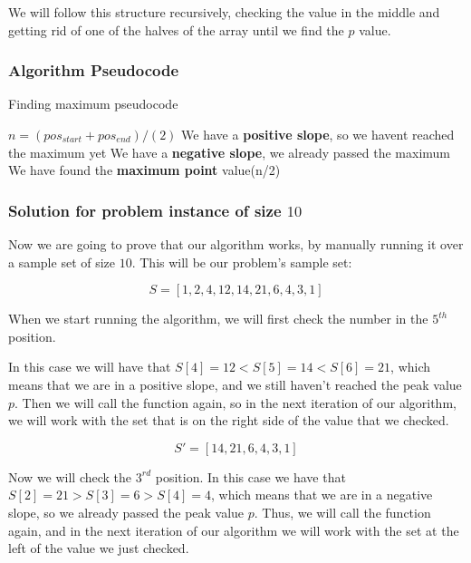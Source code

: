 \documentclass{article}
\begin{document}
We will follow this structure recursively, checking the value in the middle and getting rid of one of the halves of the array until we find the $p$ value.

\subsubsection*{Algorithm Pseudocode}

\begin{algorithm}[H]
\caption{Finding maximum pseudocode}
\begin{algorithmic}[1]
 \State $n = (pos_{start}+pos_{end})/(2)$
  \State We have a \textbf{positive slope}, so we havent reached the maximum yet
  \State {}
  \State We have a \textbf{negative slope}, we already passed the maximum
  \State {}
  \State We have found the \textbf{maximum point}
  \State \Return value(n/2)
 \EndIf
\EndFunction
\end{algorithmic}
\end{algorithm}

\subsubsection*{Solution for problem instance of size $10$}

Now we are going to prove that our algorithm works, by manually running it over a sample set of size $10$. This will be our problem's sample set:

$$S = [1,2,4,12,14,21,6,4,3,1]$$

When we start running the algorithm, we will first check the number in the $5^{th}$ position.

In this case we will have that $S[4] = 12<S[5] = 14<S[6] = 21$, which means that we are in a positive slope, and we still haven't reached the peak value $p$. Then we will call the function again, so in the next iteration of our algorithm, we will work with the set that is on the right side of the value that we checked.

$$S' = [14,21,6,4,3,1]$$

Now we will check the $3^{rd}$ position. In this case we have that $S[2] = 21>S[3] = 6>S[4] = 4$, which means that we are in a negative slope, so we already passed the peak value $p$. Thus, we will call the function again, and in the next iteration of our algorithm we will work with the set at the left of the value we just checked.
\end{document}
